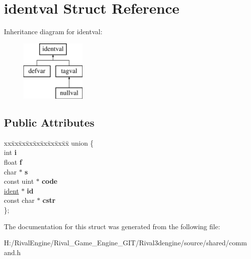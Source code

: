 \hypertarget{structidentval}{}\section{identval Struct Reference}
\label{structidentval}
Inheritance diagram for identval\+:\begin{figure}[H]
\begin{center}
\leavevmode
\includegraphics[height=3.000000cm]{structidentval}
\end{center}
\end{figure}
\subsection*{Public Attributes}
\begin{DoxyCompactItemize}
\item 
\mbox{\label{structidentval_a54bccf77558ce4f8110a42fd15b5dcb1}} 
\begin{tabbing}
xx\=xx\=xx\=xx\=xx\=xx\=xx\=xx\=xx\=\kill
union \{\\
\>int {\bfseries i}\\
\>float {\bfseries f}\\
\>char $\ast$ {\bfseries s}\\
\>const uint $\ast$ {\bfseries code}\\
\>\hyperlink{structident}{ident} $\ast$ {\bfseries id}\\
\>const char $\ast$ {\bfseries cstr}\\
\}; \\

\end{tabbing}\end{DoxyCompactItemize}


The documentation for this struct was generated from the following file\+:\begin{DoxyCompactItemize}
\item 
H\+:/\+Rival\+Engine/\+Rival\+\_\+\+Game\+\_\+\+Engine\+\_\+\+G\+I\+T/\+Rival3dengine/source/shared/command.\+h\end{DoxyCompactItemize}
